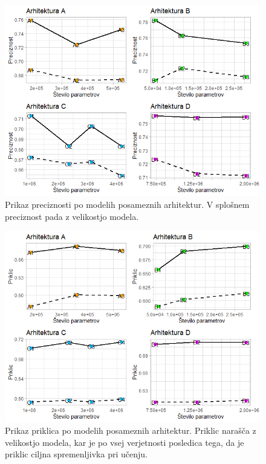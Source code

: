 \documentclass[a4paper, 12pt, openright]{book}
\begin{document}
\begin{figure}
    \centering
    \includegraphics[width=\textwidth]{precision.png}
    \caption{Prikaz preciznosti po modelih posameznih arhitektur. V splošnem preciznost pada z velikostjo modela.}
    \label{fig:precision}
\end{figure}

\begin{figure}
    \centering
    \includegraphics[width=\textwidth]{recall.png}
    \caption{Prikaz priklica po modelih posameznih arhitektur. Priklic narašča z velikostjo modela, kar je po vsej verjetnosti posledica tega, da je priklic ciljna spremenljivka pri učenju.}
    \label{fig:recall}
\end{figure}
\end{document}
